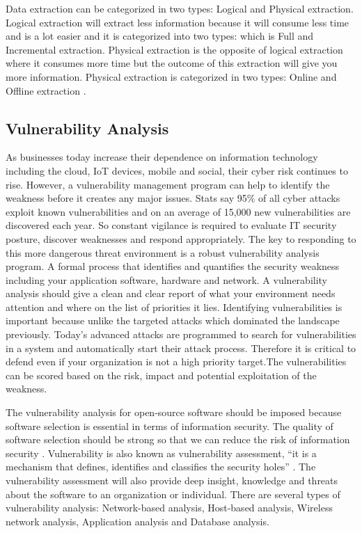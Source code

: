 Data extraction can be categorized in two types: Logical and Physical extraction. Logical extraction will extract less information because it will consume less time and is a lot easier and it is categorized into two types: which is Full and Incremental extraction. Physical extraction is the opposite of logical extraction where it consumes more time but the outcome of this extraction will give you more information. Physical extraction is categorized in two types: Online and Offline extraction \cite{DataWH}.
%
\subsection{Vulnerability Analysis}
As businesses today increase their dependence on information technology including the cloud, IoT devices, mobile and social, their cyber risk continues to rise. However, a vulnerability management program can help to identify the weakness before it creates any major issues. Stats say 95\% of all cyber attacks exploit known vulnerabilities and on an average of 15,000 new vulnerabilities are discovered each year\cite{Rh2019}. So constant vigilance is required to evaluate IT security posture, discover weaknesses and respond appropriately. The key to responding to this more dangerous threat environment is a robust vulnerability analysis program. A formal process that identifies and quantifies the security weakness including your application software, hardware and network. A vulnerability analysis should give a clean and clear report of what your environment needs attention and where on the list of priorities it lies. Identifying vulnerabilities is important  because unlike the targeted attacks which dominated the landscape previously. Today’s advanced attacks are programmed to search for vulnerabilities in a system and automatically start their attack process. Therefore it is critical to defend even if your organization is not a high priority target.The vulnerabilities can be scored based on the risk, impact and potential exploitation of the weakness.

The vulnerability analysis for open-source software should be imposed because software selection is essential in terms of information security. The quality of software selection should be strong so that we can reduce the risk of information security \cite{KeJaSa2005}. Vulnerability is also known as vulnerability assessment, “it is a mechanism that defines, identifies and classifies the security holes” \cite{KeJaSa2005}. The vulnerability assessment will also provide deep insight, knowledge and threats about the software to an organization or individual. There are several types of vulnerability analysis: Network-based analysis, Host-based analysis, Wireless network analysis, Application analysis and Database analysis.
